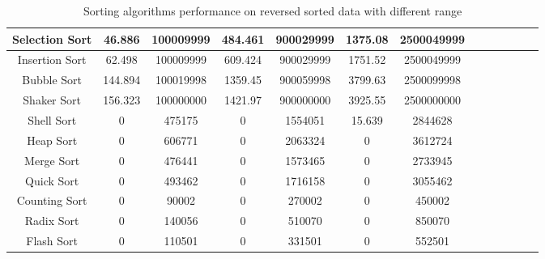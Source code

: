 \documentclass[11pt,a4paper]{article}
\begin{document}
{\begin{table}[H]
{\begin{tabular}{|c|c|c|c|c|c|c|c|c|c|c|c|c|}
		 \hline
		 Selection Sort & 46.886 & 100009999 & 484.461 & 900029999 & 1375.08 & 2500049999\\
		 \hline
		 Insertion Sort & 62.498 & 100009999 & 609.424 & 900029999 & 1751.52 & 2500049999\\
		 \hline
		 Bubble Sort 	& 144.894 & 100019998 & 1359.45 & 900059998 & 3799.63 & 2500099998\\
		 \hline
		 Shaker Sort 	& 156.323 & 100000000 & 1421.97 & 900000000 & 3925.55 & 2500000000\\
		 \hline
		 Shell Sort		& 0 & 475175 & 0 & 1554051 & 15.639 & 2844628\\
		 \hline
		 Heap Sort		& 0 & 606771 & 0 & 2063324 & 0 & 3612724\\
		 \hline
		 Merge Sort		& 0 & 476441 & 0 & 1573465 & 0 & 2733945\\
		 \hline
		 Quick Sort		& 0 & 493462 & 0 & 1716158 & 0 & 3055462\\
		 \hline
		 Counting Sort 	& 0 & 90002 & 0 & 270002 & 0 & 450002\\
		 \hline
		 Radix Sort 	& 0 & 140056 & 0 & 510070 & 0 & 850070\\
		 \hline
		 Flash Sort 	& 0 & 110501 & 0 & 331501 & 0 & 552501\\
		 \hline
			\end{tabular}}
		\caption{Sorting algorithms performance on reversed sorted data with different range}
		\end{table}
		
}
\end{document}
